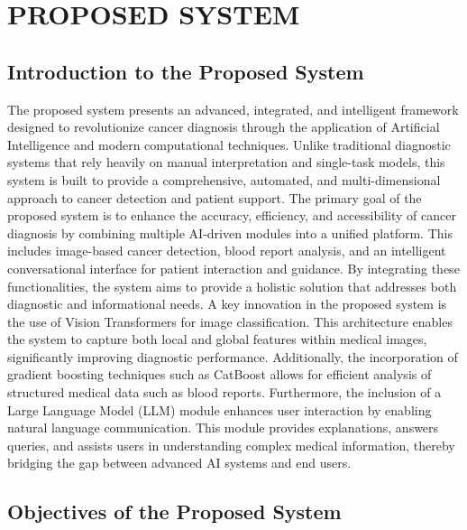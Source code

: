\documentclass[a4paper,12pt]{report}
\begin{document}
\chapter{PROPOSED SYSTEM}
\label{chap:proposed_work}
\begin{doublespace}
\section{Introduction to the Proposed System}
\label{sec:problem_statement}

The proposed system presents an advanced, integrated, and intelligent framework designed to revolutionize cancer diagnosis through the application of Artificial Intelligence and modern computational techniques. Unlike traditional diagnostic systems that rely heavily on manual interpretation and single-task models, this system is built to provide a comprehensive, automated, and multi-dimensional approach to cancer detection and patient support.
The primary goal of the proposed system is to enhance the accuracy, efficiency, and accessibility of cancer diagnosis by combining multiple AI-driven modules into a unified platform. This includes image-based cancer detection, blood report analysis, and an intelligent conversational interface for patient interaction and guidance. By integrating these functionalities, the system aims to provide a holistic solution that addresses both diagnostic and informational needs.
A key innovation in the proposed system is the use of Vision Transformers for image classification. This architecture enables the system to capture both local and global features within medical images, significantly improving diagnostic performance. Additionally, the incorporation of gradient boosting techniques such as CatBoost allows for efficient analysis of structured medical data such as blood reports.
Furthermore, the inclusion of a Large Language Model (LLM) module enhances user interaction by enabling natural language communication. This module provides explanations, answers queries, and assists users in understanding complex medical information, thereby bridging the gap between advanced AI systems and end users.

\section{Objectives of the Proposed System}
\label{sec:proposed_methodology}


\end{doublespace}
\end{document}
